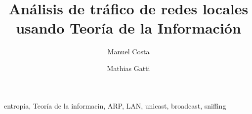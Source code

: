\documentclass[%
	final, %
	notitlepage,
	narroweqnarray,
	inline,
	twoside,
	]{ieee}
\begin{document}
\title[Wiretapping]{%
	Análisis de tráfico de redes locales usando Teoría de la Información
}

\author[COSTA, GATTI]{
Manuel Costa %
\and{}Mathias Gatti
}



\maketitle               

\begin{abstract} 
\end{abstract}

\begin{keywords}
entropía, Teoría de la informacin, ARP, LAN, unicast, broadcast, sniffing
\end{keywords}















\end{document}
